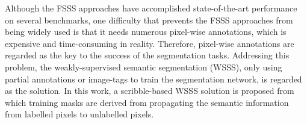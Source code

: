 \documentclass[journal]{IEEEtran}
\begin{document}
Although the FSSS approaches have accomplished state-of-the-art performance \cite{chen2017deeplab,hariharan2015hypercolumns,chen2017rethinking,long2015fully} on several benchmarks, one difficulty that prevents the FSSS approaches from being widely used is that it needs numerous pixel-wise annotations, which is expensive and time-consuming in reality. Therefore, pixel-wise annotations are regarded as the key to the success of the segmentation tasks. Addressing this problem, the weakly-supervised semantic segmentation (WSSS), only using partial annotations or image-tags to train the segmentation network, is regarded as the solution. In this work, a scribble-based WSSS solution is proposed from which training masks are derived from propagating the semantic information from labelled pixels to unlabelled pixels. 
\end{document}
